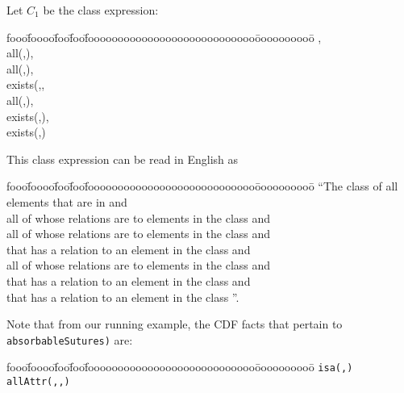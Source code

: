\begin{example} \label{ex:firstce} \rm
Let $C_1$ be the class expression: 
{\em {\small
\begin{tabbing}
fooo\=foooo\=foo\=foo\=foooooooooooooooooooooooooooo\=oooooooooo\=\kill
\> , \\
\> all(,), \\
\> all(,), \\
\> \> 	exists(,, \\
\> all(,),  \\
\> \> 	exists(,),  \\
\> \> 	exists(,)  
\end{tabbing}
} }
This class expression can be read in English as 
\begin{tabbing}
fooo\=foooo\=foo\=foo\=foooooooooooooooooooooooooooo\=oooooooooo\=\kill
\> ``The class of all
elements that are in {\tt {}} and \\
\> all of whose {\tt {}} relations are to elements in
the class {\tt {}} and \\
\> all of whose {\tt {}} relations are to elements in
the class {\tt {}} and \\
\> that has a {\tt {}} relation to an element in
the class {\tt {}} and \\
\> all of whose {\tt {}} relations are to elements in
the class {\tt {}} and \\
\> that has a {\tt {}} relation to an element in
the class {\tt {}} and \\
\> that has a {\tt {}} relation to an element in
the class {\tt {}}''.
\end{tabbing}
\noindent
Note that from our running example, the CDF facts that pertain to {\tt
absorbableSutures)} are: 
{\small
\begin{tabbing}
fooo\=foooo\=foo\=foo\=foooooooooooooooooooooooooooo\=oooooooooo\=\kill
\> {\tt isa(,)}  \\
\> {\tt allAttr(,,)} \\

\end{tabbing}}
\end{example}
